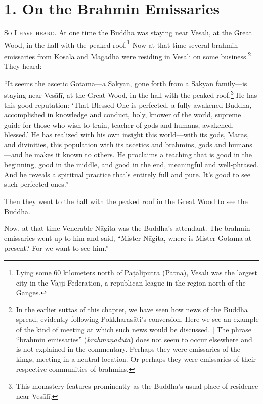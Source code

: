 \documentclass[12pt,openany]{book}%
\newcommand*{\scevam}[1]{\textsc{#1}}
\begin{document}
\section*{1. On the Brahmin Emissaries }

\scevam{So I have heard. }At one time the Buddha was staying near \textsanskrit{Vesālī}, at the Great Wood, in the hall with the peaked roof.\footnote{Lying some 60 kilometers north of \textsanskrit{Pāṭaliputra} (Patna), \textsanskrit{Vesālī} was the largest city in the Vajji Federation, a republican league in the region north of the Ganges. } Now at that time several brahmin emissaries from Kosala and Magadha were residing in \textsanskrit{Vesālī} on some business.\footnote{In the earlier suttas of this chapter, we have seen how news of the Buddha spread, evidently following \textsanskrit{Pokkharasāti}’s conversion. Here we see an example of the kind of meeting at which such news would be discussed. | The phrase “brahmin emissaries” (\textit{\textsanskrit{brāhmaṇadūtā}}) does not seem to occur elsewhere and is not explained in the commentary. Perhaps they were emissaries of the kings, meeting in a neutral location. Or perhaps they were emissaries of their respective communities of brahmins. } They heard: 

“It seems the ascetic Gotama—a Sakyan, gone forth from a Sakyan family—is staying near \textsanskrit{Vesālī}, at the Great Wood, in the hall with the peaked roof.\footnote{This monastery features prominently as the Buddha’s usual place of residence near \textsanskrit{Vesālī}. } He has this good reputation: ‘That Blessed One is perfected, a fully awakened Buddha, accomplished in knowledge and conduct, holy, knower of the world, supreme guide for those who wish to train, teacher of gods and humans, awakened, blessed.’ He has realized with his own insight this world—with its gods, \textsanskrit{Māras}, and divinities, this population with its ascetics and brahmins, gods and humans—and he makes it known to others. He proclaims a teaching that is good in the beginning, good in the middle, and good in the end, meaningful and well-phrased. And he reveals a spiritual practice that’s entirely full and pure. It’s good to see such perfected ones.” 

Then they went to the hall with the peaked roof in the Great Wood to see the Buddha. 

Now, at that time Venerable \textsanskrit{Nāgita} was the Buddha’s attendant. The brahmin emissaries went up to him and said, “Mister \textsanskrit{Nāgita}, where is Mister Gotama at present? For we want to see him.” 
\end{document}
